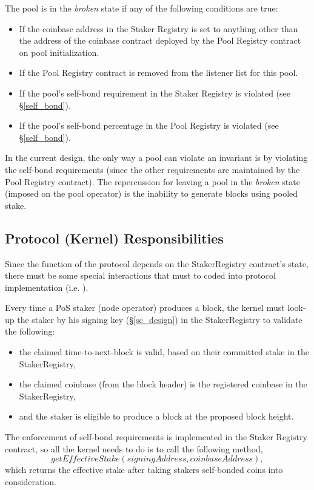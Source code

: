 The pool is in the \textit{broken} state if any of the following conditions are true: 
\begin{itemize}
    \item If the coinbase address in the Staker Registry is set to anything other than the address of the coinbase contract deployed by the Pool Registry contract on pool initialization. 
    \item If the Pool Registry contract is removed from the listener list for this pool. 
    \item If the pool's self-bond requirement in the Staker Registry is violated (see \S\ref{self_bond}).
    \item If the pool's self-bond percentage in the Pool Registry is violated (see \S\ref{self_bond}).
\end{itemize}

In the current design, the only way a pool can violate an invariant is by violating the self-bond requirements (since the other requirements are maintained by the Pool Registry contract). The repercussion for leaving a pool in the \textit{broken} state (imposed on the pool operator) is the inability to generate blocks using pooled stake.

\subsection{Protocol (Kernel) Responsibilities}
Since the function of the protocol depends on the StakerRegistry contract's state, there must be some special interactions that must to coded into protocol implementation (i.e. ). 

Every time a PoS staker (node operator) produces a block, the kernel must look-up the staker by his signing key (\S\ref{sc_design}) in the StakerRegistry to validate the following:
\begin{itemize}[label=--,nosep]
    \item the claimed time-to-next-block is valid, based on their committed stake in the StakerRegistry,
    \item the claimed coinbase (from the block header) is the registered coinbase in the StakerRegistry,
    \item and the staker is eligible to produce a block at the proposed block height. 
\end{itemize}

The enforcement of self-bond requirements is implemented in the Staker Registry contract, so all the kernel needs to do is to call the following method, $$getEffectiveStake(signingAddress, coinbaseAddress),$$
which returns the effective stake after taking stakers self-bonded coins into consideration.

